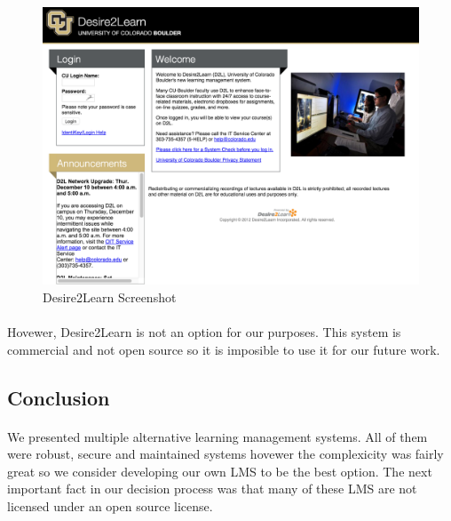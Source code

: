 \begin{figure}[h]
    \centering
    \includegraphics[width=\textwidth]{courses/d2l.png}
    \caption{Desire2Learn Screenshot}
    \label{d2l}
\end{figure}

\paragraph{}
Hovewer, Desire2Learn is not an option for our purposes. This system is commercial and not open source so it is imposible to use it for our future work.

\subsection{Conclusion}

\paragraph{}
We presented multiple alternative learning management systems. All of them were robust, secure and maintained systems hovewer the complexicity was fairly great so we consider developing our own LMS to be the best option. The next important fact in our decision process was that many of these LMS are not licensed under an open source license.